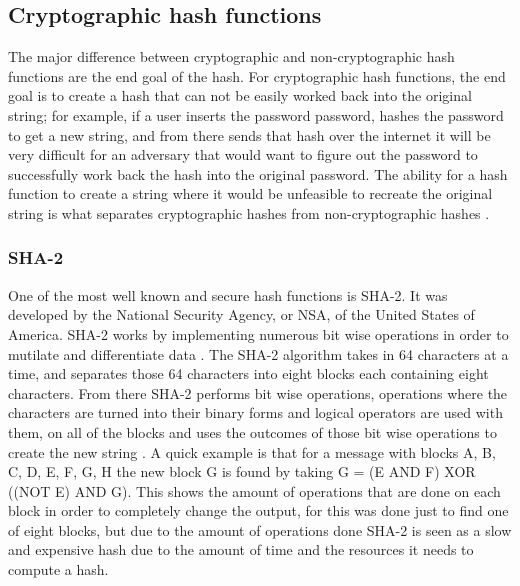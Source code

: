 \documentclass[a4paper, 10pt, draftclsnofoot, onecolumn]{article}
\begin{document}
\subsection*{Cryptographic hash functions}
The major difference between cryptographic and non-cryptographic hash functions are the end goal of the hash. For cryptographic hash functions, the end goal is to create a hash that can not be easily worked back into the original string; for example, if a user inserts the password {\selectfont password}, hashes the password to get a new string, and from there sends that hash over the internet it will be very difficult for an adversary that would want to figure out the password to successfully work back the hash into the original password. The ability for a hash function to create a string where it would be unfeasible to recreate the original string is what separates cryptographic hashes from non-cryptographic hashes \cite{hashes}.

\subsubsection*{SHA-2}
One of the most well known and secure hash functions is SHA-2. It was developed by the National Security Agency, or NSA, of the United States of America. SHA-2 works by implementing numerous bit wise operations in order to mutilate and differentiate data \cite{SHA}. The SHA-2 algorithm takes in 64 characters at a time, and separates those 64 characters into eight blocks each containing eight characters. From there SHA-2 performs bit wise operations, operations where the characters are turned into their binary forms and logical operators are used with them, on all of the blocks and uses the outcomes of those bit wise operations to create the new string \cite{SHA}. A quick example is that for a message with blocks {\selectfont A, B, C, D, E, F, G, H} the new block {\selectfont G} is found by taking {\selectfont G = (E AND F) XOR ((NOT E) AND G)}. This shows the amount of operations that are done on each block in order to completely change the output, for this was done just to find one of eight blocks, but due to the amount of operations done SHA-2 is seen as a slow and expensive hash due to the amount of time and the resources it needs to compute a hash.
\end{document}
